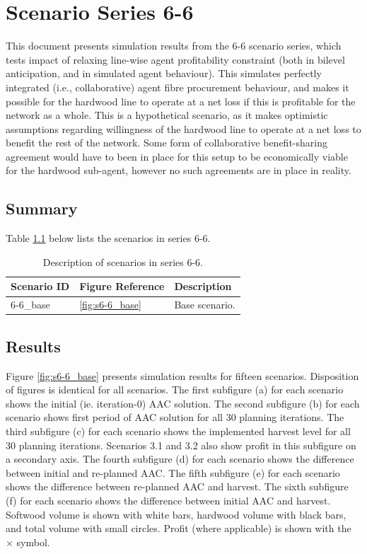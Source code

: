 \chapter{Scenario Series 6-6}

This document presents simulation results from the 6-6 scenario series, which tests impact of relaxing line-wise agent profitability constraint (both in bilevel anticipation, and in simulated agent behaviour). 
This simulates perfectly integrated (i.e., collaborative) agent fibre procurement behaviour, and makes it possible for the hardwood line to operate at a net loss if this is profitable for the network as a whole. 
This is a hypothetical scenario, as it makes optimistic assumptions regarding willingness of the hardwood line to operate at a net loss to benefit the rest of the network.
Some form of collaborative benefit-sharing agreement would have to been in place for this setup to be economically viable for the hardwood sub-agent, however no such agreements are in place in reality.

\section{Summary}
Table \ref{tab:scenario_list} below lists the scenarios in series 6-6. 

\begin{table}
  \centering
  \begin{tabular}{lll}
    \hline
    Scenario ID & Figure Reference & Description \\
    \hline
    6-6\_base & \ref{fig:s6-6_base} & Base scenario. \\
    \hline
  \end{tabular}
  \caption{Description of scenarios in series 6-6.}
  \label{tab:scenario_list}
\end{table}

\section{Results}

Figure \ref{fig:s6-6_base} presents
simulation results for fifteen scenarios. %
Disposition of figures is identical for all scenarios. The
first subfigure (a) for each scenario shows the initial
(ie. iteration-0) AAC solution. The second subfigure (b) for each
scenario shows first period of AAC solution for all 30 planning
iterations. The third subfigure (c) for each scenario shows the
implemented harvest level for all 30 planning iterations. Scenarios
3.1 and 3.2 also show profit in this subfigure on a secondary
axis. The fourth subfigure (d) for each scenario shows the difference
between initial and re-planned AAC. The fifth subfigure (e) for each
scenario shows the difference between re-planned AAC and harvest.  The
sixth subfigure (f) for each scenario shows the difference between
initial AAC and harvest. Softwood volume is shown with white bars,
hardwood volume with black bars, and total volume with small
circles. Profit (where applicable) is shown with the $\times$
symbol. 

